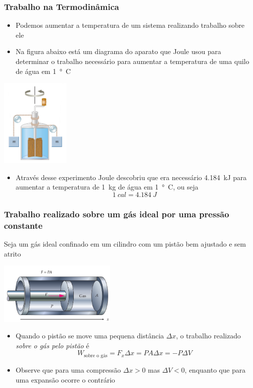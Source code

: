 \begin{frame}
    \frametitle{Trabalho na Termodinâmica}
    \begin{itemize}
        \item Podemos aumentar a temperatura de um sistema realizando trabalho sobre ele
        \item Na figura abaixo está um diagrama do aparato que Joule usou para
            determinar o trabalho necessário para aumentar a temperatura de uma quilo
            de água em \SI{1}{\degree C}
    \end{itemize}
    \begin{center}
        \includegraphics[width=0.25\textwidth]{images/joule.png}
    \end{center}
\end{frame}

\begin{frame}[c]
    \begin{itemize}
        \item Através desse experimento Joule descobriu que era necessário
            \SI{4,184}{kJ} para aumentar a temperatura de \SI{1}{kg} de água em
            \SI{1}{\degree C}, ou seja
            \[
                \SI{1}{cal} = \SI{4,184}{J}
            \]

    \end{itemize}
\end{frame}

\begin{frame}
    \frametitle{Trabalho realizado sobre um gás ideal por uma pressão constante}
    Seja um gás ideal confinado em um cilindro com um pistão bem ajustado e sem atrito
    \begin{center}
        \includegraphics[width=0.425\textwidth]{images/quasistatic}
    \end{center}
    \begin{itemize}
        \item Quando o pistão se move uma pequena distância $\Delta x$, o trabalho realizado \textit{sobre o gás pelo pistão} é
            \[
                W_{\text{sobre~o~gás}} = F_x \Delta x=PA \Delta x=-P\Delta V
            \]
        \item Observe que para uma compressão $\Delta x > 0$ mas $\Delta V < 0$, enquanto que para uma expansão ocorre o contrário
    \end{itemize}

\end{frame}
